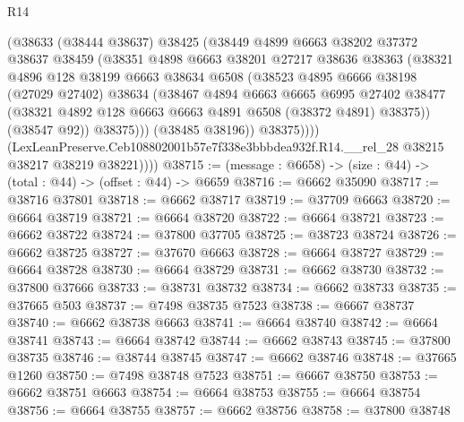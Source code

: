 \begin{lexlean}{R14}
\begin{coremodule}
                  (@38633
                    (@38444 @38637)
                    @38425
                    (@38449
                      @4899
                      @6663
                      @38202
                      @37372
                      @38637
                      @38459
                      (@38351
                        @4898
                        @6663
                        @38201
                        @27217
                        @38636
                        @38363
                        (@38321
                          @4896
                          @128
                          @38199
                          @6663
                          @38634
                          @6508
                          (@38523
                            @4895
                            @6666
                            @38198
                            (@27029 @27402)
                            @38634
                            (@38467
                              @4894
                              @6663
                              @6665
                              @6995
                              @27402
                              @38477
                              (@38321 @4892 @128 @6663 @6663 @4891 @6508 (@38372 @4891) @38375))
                            (@38547 @92))
                          @38375)))
                    (@38485 @38196))
                  @38375))))
          (LexLeanPreserve.Ceb108802001b57e7f338e3bbbdea932f.R14.__rel_28
            @38215
            @38217
            @38219
            @38221))))
@38715 := (message : @6658) -> (size : @44) -> (total : @44) -> (offset : @44) -> @6659
@38716 := @6662 @35090
@38717 := @38716 @37801
@38718 := @6662 @38717
@38719 := @37709 @6663
@38720 := @6664 @38719
@38721 := @6664 @38720
@38722 := @6664 @38721
@38723 := @6662 @38722
@38724 := @37800 @37705
@38725 := @38723 @38724
@38726 := @6662 @38725
@38727 := @37670 @6663
@38728 := @6664 @38727
@38729 := @6664 @38728
@38730 := @6664 @38729
@38731 := @6662 @38730
@38732 := @37800 @37666
@38733 := @38731 @38732
@38734 := @6662 @38733
@38735 := @37665 @503
@38737 := @7498 @38735 @7523
@38738 := @6667 @38737
@38740 := @6662 @38738 @6663
@38741 := @6664 @38740
@38742 := @6664 @38741
@38743 := @6664 @38742
@38744 := @6662 @38743
@38745 := @37800 @38735
@38746 := @38744 @38745
@38747 := @6662 @38746
@38748 := @37665 @1260
@38750 := @7498 @38748 @7523
@38751 := @6667 @38750
@38753 := @6662 @38751 @6663
@38754 := @6664 @38753
@38755 := @6664 @38754
@38756 := @6664 @38755
@38757 := @6662 @38756
@38758 := @37800 @38748

\end{coremodule}
\end{lexlean}
